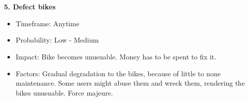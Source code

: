 \documentclass[a4paper]{article}
\begin{document}
\ \\ \ \\ 
\textbf{5. Defect bikes}
\begin{itemize}
\item Timeframe: Anytime 
\item Probability: Low - Medium
\item Impact: Bike becomes unusuable. Money has to be spent to fix it.
\item Factors: Gradual degradation to the bikes, because of little to none maintenance. Some users might abuse them and wreck them, rendering the bikes unusuable. Force majeure.
\end{itemize}
\ \\ \ \\ 
\end{document}
